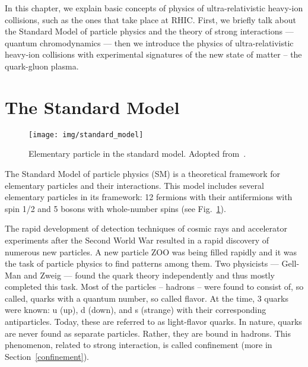 In this chapter, we explain basic concepts of physics of ultra-relativistic heavy-ion collisions, such as the ones that take place at RHIC\@. First, we briefly talk about the Standard Model of particle physics and the theory of strong interactions --- quantum chromodynamics --- then we introduce the physics of ultra-relativistic heavy-ion collisions with experimental signatures of the new state of matter -- the quark-gluon plasma. 

\section{The Standard Model}

\begin{figure}[!htb]
\centering
\texttt{[image: img/standard\_model]}
\caption[Elementary particle in the standard model.]{\label{standard_model}Elementary particle in the standard model. Adopted from~\cite{standardModel}\@.}
\end{figure}

The Standard Model of particle physics (SM) is a theoretical framework for elementary particles and their interactions. This model includes several elementary particles in its framework: 12 fermions with their antifermions with spin 1/2 and 5 bosons with whole-number spins (see Fig.\ \ref{standard_model})\@.

The rapid development of detection techniques of cosmic rays and accelerator experiments after the Second World War resulted in a rapid discovery of numerous new particles. A new particle ZOO was being filled rapidly and it was the task of particle physics to find patterns among them. Two physicists --- Gell-Man and Zweig --- found the quark theory independently and thus mostly completed this task. Most of the particles -- hadrons -- were found to consist of, so called, quarks with a quantum number, so called flavor. At the time, 3 quarks were known: u (up), d (down), and s (strange) with their corresponding antiparticles. Today, these are referred to as light-flavor quarks. In nature, quarks are never found as separate particles. Rather, they are bound in hadrons. This phenomenon, related to strong interaction, is called confinement (more in Section~\ref{confinement})\@.

